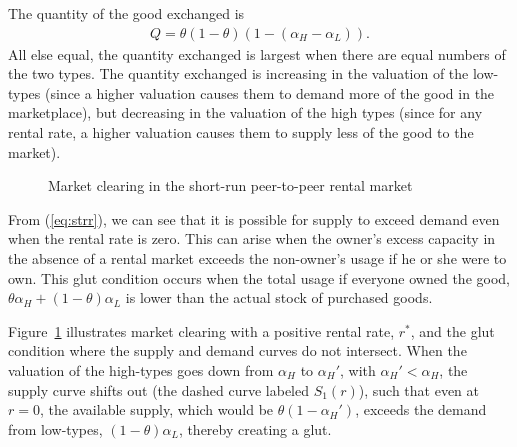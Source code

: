 \documentclass[11pt]{article}
\begin{document}
The quantity of the good exchanged is 
\begin{align} \label{eq:qty}
  Q = \theta (1-\theta) \left(1 - (\alpha_H - \alpha_L)\right).
\end{align} 
All else equal, the quantity exchanged is largest when there are equal numbers of the two types.
The quantity exchanged is increasing in the valuation of the low-types (since a higher valuation causes them to demand more of the good in the marketplace), but decreasing in the valuation of the high types (since for any rental rate, a higher valuation causes them to supply less of the good to the market). 
 
\newcommand*{\alphaH}{0.80}%
\newcommand*{\alphaL}{0.50}%
\newcommand*{\alphaHp}{0.40}
\pgfmathsetmacro{\r}{-1 + \alphaH + \alphaL}%
\pgfmathsetmacro{\Q}{\alphaL - \r/2}
\begin{figure} 
\caption{Market clearing in the short-run peer-to-peer rental market} 
\label{fig:market_clearing} 
\begin{center}
\end{center}
\end{figure} 

From (\ref{eq:strr}), we can see that it is possible for supply to exceed demand even when the rental rate is zero. 
This can arise when the owner's excess capacity in the absence of a
rental market exceeds the non-owner's usage if he or she were to own. 
This glut condition occurs when the total usage if everyone owned the good, $\theta \alpha_H + (1-\theta)\alpha_L$ is lower than the actual stock of purchased goods. 

Figure~\ref{fig:market_clearing} illustrates market clearing with a positive rental rate, $r^*$, and the glut condition where the supply and demand curves do not intersect.
When the valuation of the high-types goes down from $\alpha_H$ to $\alpha_H'$, with $\alpha_H' < \alpha_H$, the supply curve shifts out (the dashed curve labeled $S_1(r)$), such that even at $r = 0$, the available supply, which would be $\theta (1-\alpha_H')$, exceeds the demand from low-types, $(1-\theta)\alpha_L$, thereby creating a glut.  
\end{document}
